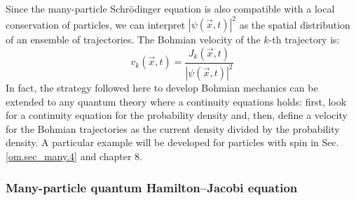 \documentclass[onecolumn,nofootinbib, secnumarabic, amsmath, nobibnotes,12pt,aps,pra]{revtex4-1}
\newcommand{\sref}[1]{Sec. \ref{#1}}
\begin{document}
Since the many-particle Schr\"odinger equation is also compatible with a local conservation of particles, we can interpret $|\psi(\vec{x},t)|^2$ as the spatial distribution of an ensemble of trajectories. The Bohmian velocity of the $k$-th trajectory is:
\begin{equation}
\label{om.velocityND}
v_k(\vec{x},t) = \frac{J_k(\vec{x},t)} {|\psi(\vec{x},t)|^2}
\end{equation}
In fact, the strategy followed here to develop Bohmian mechanics can be extended to any quantum theory where a continuity equations holds: first, look for a continuity equation for the probability density and, then, define a velocity for the Bohmian trajectories as the current density divided by the probability density.
A particular example will be developed for particles with spin in \sref{om.sec_many.4} and chapter 8.

\subsubsection{Many-particle quantum Hamilton--Jacobi equation}
\end{document}
